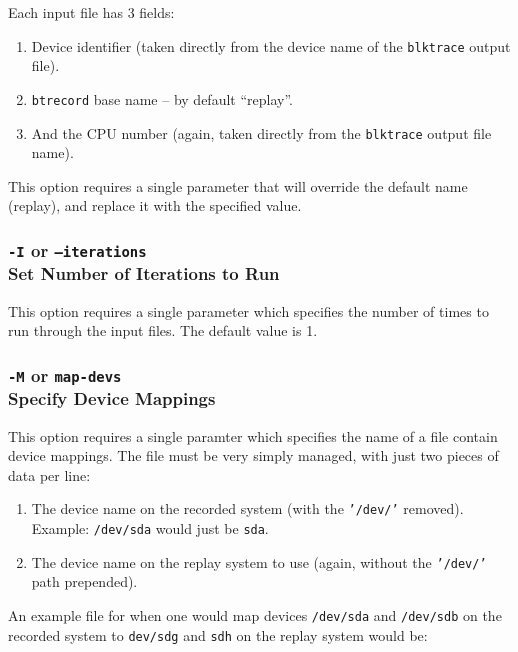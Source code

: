 \documentclass{article}
\begin{document}
Each input file has 3 fields:

\begin{enumerate}
  \item Device identifier (taken directly from the device name of the
  \texttt{blktrace} output file).

  \item \texttt{btrecord} base name -- by default ``replay''.

  \item And the CPU number (again, taken directly from the
  \texttt{blktrace} output file name).
\end{enumerate}

This option requires a single parameter that will override the default name
(replay), and replace it with the specified value.

\subsubsection{\label{sec:p-o-I}\texttt{-I} or
\texttt{--iterations}\\Set Number of Iterations to Run}

This option requires a single parameter which specifies the number of times
to run through the input files. The default value is 1.

\subsubsection{\label{sec:p-o-M}\texttt{-M} or \texttt{map-devs}\\
Specify Device Mappings}

This option requires a single paramter which specifies the name of a
file contain device mappings. The file must be very simply managed, with
just two pieces of data per line:

\begin{enumerate}
  \item The device name on the recorded system (with the \texttt{'/dev/'}
  removed). Example: \texttt{/dev/sda} would just be \texttt{sda}.

  \item The device name on the replay system to use (again, without the
  \texttt{'/dev/'} path prepended).
\end{enumerate}

An example file for when one would map devices \texttt{/dev/sda} and
\texttt{/dev/sdb} on the recorded system to \texttt{dev/sdg} and
\texttt{sdh} on the replay system would be:
\end{document}
